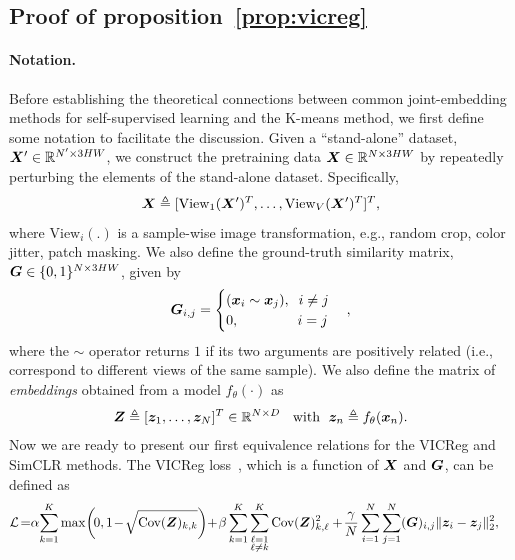 \documentclass{article} %
\begin{document}
    
    
\subsection{Proof of proposition~\ref{prop:vicreg}}
\label{proof:kmeans2}


\paragraph{Notation.}
Before establishing the theoretical connections between common joint-embedding methods for self-supervised learning and the K-means method, we first define some notation to facilitate the discussion.
Given a ``stand-alone'' dataset, ${\bm{X}}'\in\mathbb{R}^{N^\prime\times 3HW}$, we construct the pretraining data ${\bm{X}} \in \mathbb{R}^{N\times 3HW}$ by repeatedly perturbing the elements of the stand-alone dataset.
Specifically,
\[
    {\bm{X}} \triangleq [\text{View}_1({\bm{X}}')^T,\dots,\text{View}_V({\bm{X}}')^T]^T,
\]
where $\text{View}_i(.)$ is a sample-wise image transformation, e.g., random crop, color jitter, patch masking.
We also define the ground-truth similarity matrix, ${\bm{G}} \in \{0,1\}^{N \times 3HW}$, given by
\[
    {\bm{G}}_{i,j}=
    \begin{cases}
        ({\bm{x}}_i \sim {\bm{x}}_j), \;\; i \neq j\\
        0, \;\;\;\;\;\;\;\;\;\;\;\;\;\;\; i=j
    \end{cases},
\]
where the $\sim$ operator returns $1$ if its two arguments are positively related (i.e., correspond to different views of the same sample).
We also define the matrix of {\em embeddings} obtained from a model $f_{\theta}(\cdot)$ as
\begin{align}
    {\bm{Z}}\triangleq[{\bm{z}}_1,\dots,{\bm{z}}_N]^T\in\mathbb{R}^{N \times D}\;\;\text{ with }\;{\bm{z}}_n\triangleq f_{\theta}({\bm{x}}_n).\label{eq:embedding}
\end{align}
Now we are ready to present our first equivalence relations for the VICReg and SimCLR methods.
The VICReg loss~\citep{bardes2021vicreg}, which is a function of ${\bm{X}}$ and ${\bm{G}}$, can be defined as
\begin{align*}
\mathcal{L}\hspace{-0.05cm}=&\alpha\hspace{-0.05cm} \sum_{k=1}^{K}\max\hspace{-0.05cm}\left(\hspace{-0.05cm}0,1\hspace{-0.05cm}-\hspace{-0.05cm}\sqrt{\Cov(\mZ)_{k,k}}\right)\hspace{-0.08cm}+\hspace{-0.05cm} \beta  \sum_{k=1}^{K}\sum_{\substack{\ell=1\\\ell \not = k}}^{K} \Cov(\mZ)^2_{k,\ell} +\hspace{-0.05cm}\frac{\gamma}{N} \sum_{i=1}^{N}\sum_{j=1}^{N}(\mG)_{i,j}\|\vz_{i}-\vz_{j}\|_2^2,
\end{align*}
\end{document}

